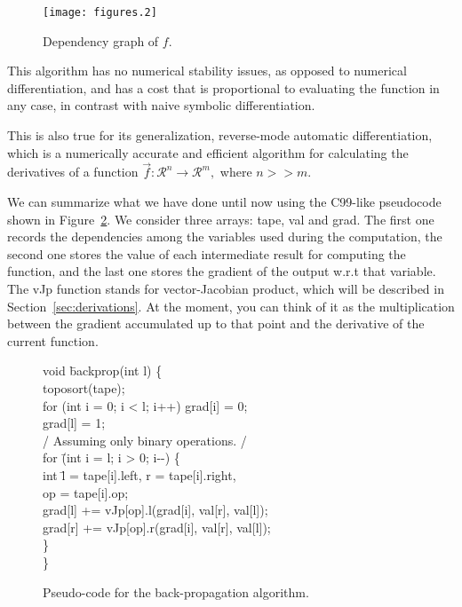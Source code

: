 \documentclass[pdflatex,sn-mathphys-num]{sn-jnl}%
\theoremstyle{thmstyleone}%
\theoremstyle{thmstyletwo}%
\theoremstyle{thmstylethree}%
\begin{document}
\begin{figure}
    \centering
    \texttt{[image: figures.2]}
    \caption{Dependency graph of \(f.\)}
    \label{fig:dag}
\end{figure}

This algorithm has no numerical stability issues, as opposed to numerical
differentiation, and has a cost that is proportional to evaluating the
function in any case, in contrast with naive symbolic differentiation.

This is also true for its generalization, reverse-mode automatic
differentiation, which is a numerically accurate and efficient algorithm for
calculating the derivatives of a function \(\vec f : \mathcal R^n \to \mathcal
R^m,\) where \(n>>m.\)

We can summarize what we have done until now using the C99-like pseudocode shown
in Figure~\ref{fig:pseudo}.  We consider three arrays: tape, val and grad. The
first one records the dependencies among the variables used during the
computation, the second one stores the value of each intermediate result for
computing the function, and the last one stores the gradient of the output w.r.t
that variable. The vJp function stands for vector-Jacobian product, which will
be described in Section~\ref{sec:derivations}. At the moment, you can think of
it as the multiplication between the gradient accumulated up to that point and
the derivative of the current function.

\newenvironment{absolutelynopagebreak}
  {\par\nobreak\vfil\penalty0\vfilneg
   \vtop\bgroup}
  {\par\xdef\tpd{\the\prevdepth}\egroup
   \prevdepth=\tpd}

\begin{figure}[h]
\centering
\begin{minipage}{.7\textwidth}
\begin{tabbing}
void \= backprop(int l) \{\+\\
    toposort(tape);\\
    for (int i = 0; i \textless{} l; i++) grad[i] = 0;\\
    grad[l] = 1;\\
    /\textasteriskcentered{}
    Assuming only binary operations.
    \textasteriskcentered/\\
    for \=(int i = l; i \textgreater{} 0; i-{}-) \{\+\\
        int \=l = tape[i].left, r = tape[i].right, \\
            \>op = tape[i].op;\\
        grad[l] += vJp[op].l(grad[i], val[r], val[l]);\\
        grad[r] += vJp[op].r(grad[i], val[r], val[l]);\-\\
    \}\-\\
\}\\
\end{tabbing}
\end{minipage}
\caption{Pseudo-code for the back-propagation algorithm. }
\label{fig:pseudo}
\end{figure}
\end{document}
